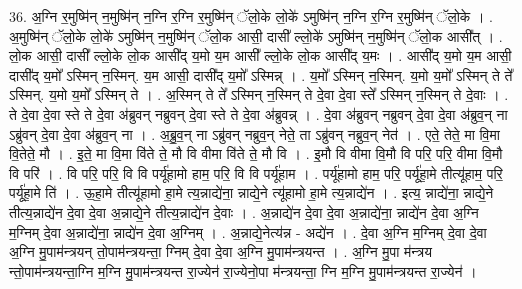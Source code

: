 \documentclass[17pt]{extarticle}
\begin{document}
36. अ॒ग्नि र॒मुष्मि॑न् न॒मुष्मि॑न् न॒ग्नि र॒ग्नि र॒मुष्मि॑न् ॅलो॒के लो॒के॑ ऽमुष्मि॑न् न॒ग्नि र॒ग्नि र॒मुष्मि॑न् ॅलो॒के । . अ॒मुष्मि॑न् ॅलो॒के लो॒के॑ ऽमुष्मि॑न् न॒मुष्मि॑न् ॅलो॒क आसी॒ दासी᳚ ल्लो॒के॑ ऽमुष्मि॑न् न॒मुष्मि॑न् ॅलो॒क आसी᳚त् । . लो॒क आसी॒ दासी᳚ ल्लो॒के लो॒क आसी᳚द् य॒मो य॒म आसी᳚ ल्लो॒के लो॒क आसी᳚द् य॒मः । . आसी᳚द् य॒मो य॒म आसी॒ दासी᳚द् य॒मो᳚ ऽस्मिन् न॒स्मिन्. य॒म आसी॒ दासी᳚द् य॒मो᳚ ऽस्मिन्न् । . य॒मो᳚ ऽस्मिन् न॒स्मिन्. य॒मो य॒मो᳚ ऽस्मिन् ते ते᳚ ऽस्मिन्. य॒मो य॒मो᳚ ऽस्मिन् ते । . अ॒स्मिन् ते ते᳚ ऽस्मिन् न॒स्मिन् ते दे॒वा दे॒वा स्ते᳚ ऽस्मिन् न॒स्मिन् ते दे॒वाः । . ते दे॒वा दे॒वा स्ते ते दे॒वा अ॑ब्रुवन् नब्रुवन् दे॒वा स्ते ते दे॒वा अ॑ब्रुवन्न् । . दे॒वा अ॑ब्रुवन् नब्रुवन् दे॒वा दे॒वा अ॑ब्रुव॒न् ना ऽब्रु॑वन् दे॒वा दे॒वा अ॑ब्रुव॒न् ना । . अ॒ब्रु॒व॒न् ना ऽब्रु॑वन् नब्रुव॒न् नेते॒ ता ऽब्रु॑वन् नब्रुव॒न् नेत॑ । . एते॒ तेते॒ मा वि॒मा वि॒तेते॒ मौ । . इ॒ते॒ मा वि॒मा वि॑ते ते॒ मौ वि वीमा वि॑ते ते॒ मौ वि । . इ॒मौ वि वीमा वि॒मौ वि परि॒ परि॒ वीमा वि॒मौ वि परि॑ । . वि परि॒ परि॒ वि वि पर्यू॑हामो हाम॒ परि॒ वि वि पर्यू॑हाम । . पर्यू॑हामो हाम॒ परि॒ पर्यू॑हा॒मे तीत्यू॑हाम॒ परि॒ पर्यू॑हा॒मे ति॑ । . ऊ॒हा॒मे तीत्यू॑हामो हा॒मे त्य॒न्नाद्ये॑ना॒ न्नाद्ये॒ने त्यू॑हामो हा॒मे त्य॒न्नाद्ये॑न । . इत्य॒ न्नाद्ये॑ना॒ न्नाद्ये॒ने तीत्य॒न्नाद्ये॑न दे॒वा दे॒वा अ॒न्नाद्ये॒ने तीत्य॒न्नाद्ये॑न दे॒वाः । . अ॒न्नाद्ये॑न दे॒वा दे॒वा अ॒न्नाद्ये॑ना॒ न्नाद्ये॑न दे॒वा अ॒ग्नि म॒ग्निम् दे॒वा अ॒न्नाद्ये॑ना॒ न्नाद्ये॑न दे॒वा अ॒ग्निम् । . अ॒न्नाद्ये॒नेत्य॑न्न - अद्ये॑न । . दे॒वा अ॒ग्नि म॒ग्निम् दे॒वा दे॒वा अ॒ग्नि मु॒पाम॑न्त्रयन् तो॒पाम॑न्त्रयन्ता॒ ग्निम् दे॒वा दे॒वा अ॒ग्नि मु॒पाम॑न्त्रयन्त । . अ॒ग्नि मु॒पा म॑न्त्रय न्तो॒पाम॑न्त्रयन्ता॒ग्नि म॒ग्नि मु॒पाम॑न्त्रयन्त रा॒ज्येन॑ रा॒ज्येनो॒पा म॑न्त्रयन्ता॒ ग्नि म॒ग्नि मु॒पाम॑न्त्रयन्त रा॒ज्येन॑ । \newline
\pagebreak
{}
\end{document}
